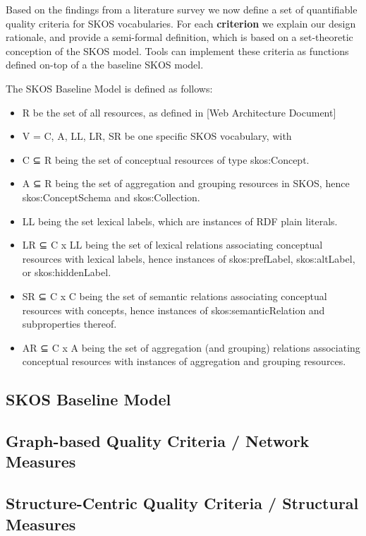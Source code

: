 \documentclass{llncs}
\begin{document}
Based on the findings from a literature survey we now define a set of quantifiable quality criteria for SKOS vocabularies. For each \textbf{criterion} we explain our design rationale, and provide a semi-formal definition, which is based on a set-theoretic conception of the SKOS model. Tools can implement these criteria as functions defined on-top of a the baseline SKOS model.

\begin{definition} The SKOS Baseline Model is defined as follows:
\begin{itemize}
	\item R be the set of all resources, as defined in [Web Architecture Document]
	\item V = {C, A, LL, LR, SR} be one specific SKOS vocabulary, with
	\item C ⊆ R being the set of conceptual resources of type skos:Concept.
	\item A ⊆ R being the set of aggregation and grouping resources in SKOS, hence skos:ConceptSchema and skos:Collection.
	\item LL being the set lexical labels, which are instances of RDF plain literals.
	\item LR ⊆ C x LL being the set of lexical relations associating conceptual resources with lexical labels, hence instances of skos:prefLabel, skos:altLabel, or skos:hiddenLabel.
\item SR ⊆ C x C being the set of semantic relations associating conceptual resources with concepts, hence instances of skos:semanticRelation and subproperties thereof.
\item AR ⊆ C x A being the set of aggregation (and grouping) relations associating conceptual resources with instances of aggregation and grouping resources.
\end{itemize}
\end{definition}

\subsection{SKOS Baseline Model}

\subsection{Graph-based Quality Criteria / Network Measures}

\subsection{Structure-Centric Quality Criteria / Structural Measures}
\end{document}
